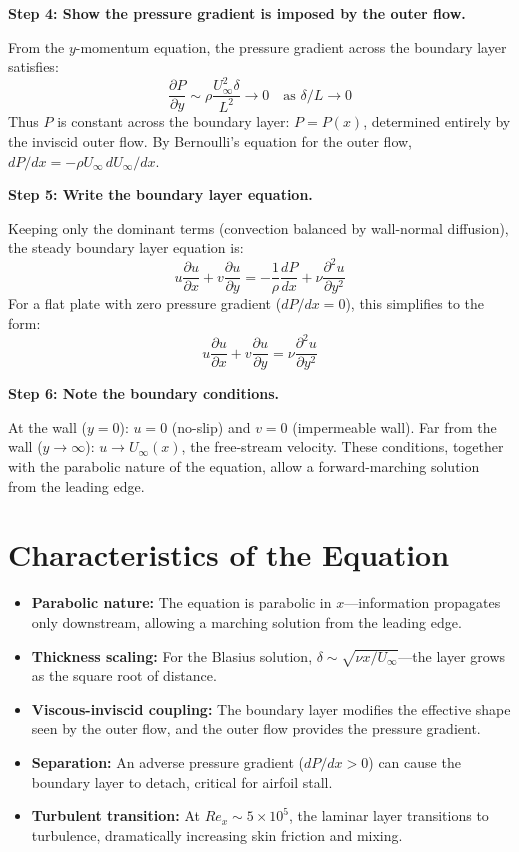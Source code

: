 \textbf{Step 4: Show the pressure gradient is imposed by the outer flow.}

From the $y$-momentum equation, the pressure gradient across the boundary layer satisfies:
\begin{equation}
\frac{\partial P}{\partial y} \sim \rho\frac{U_\infty^2 \delta}{L^2} \to 0 \quad \text{as } \delta/L \to 0
\end{equation}
Thus $P$ is constant across the boundary layer: $P = P(x)$, determined entirely by the inviscid outer flow. By Bernoulli's equation for the outer flow, $dP/dx = -\rho U_\infty\, dU_\infty/dx$.

\textbf{Step 5: Write the boundary layer equation.}

Keeping only the dominant terms (convection balanced by wall-normal diffusion), the steady boundary layer equation is:
\begin{equation}
u\frac{\partial u}{\partial x} + v\frac{\partial u}{\partial y} = -\frac{1}{\rho}\frac{dP}{dx} + \nu\frac{\partial^2 u}{\partial y^2}
\end{equation}
For a flat plate with zero pressure gradient ($dP/dx = 0$), this simplifies to the form:
\begin{equation}
\boxed{u\frac{\partial u}{\partial x} + v\frac{\partial u}{\partial y} = \nu\frac{\partial^2 u}{\partial y^2}}
\end{equation}

\textbf{Step 6: Note the boundary conditions.}

At the wall ($y = 0$): $u = 0$ (no-slip) and $v = 0$ (impermeable wall). Far from the wall ($y \to \infty$): $u \to U_\infty(x)$, the free-stream velocity. These conditions, together with the parabolic nature of the equation, allow a forward-marching solution from the leading edge.

\section*{Characteristics of the Equation}

\begin{itemize}
\item \textbf{Parabolic nature:} The equation is parabolic in $x$---information propagates only downstream, allowing a marching solution from the leading edge.
\item \textbf{Thickness scaling:} For the Blasius solution, $\delta \sim \sqrt{\nu x / U_\infty}$---the layer grows as the square root of distance.
\item \textbf{Viscous-inviscid coupling:} The boundary layer modifies the effective shape seen by the outer flow, and the outer flow provides the pressure gradient.
\item \textbf{Separation:} An adverse pressure gradient ($dP/dx > 0$) can cause the boundary layer to detach, critical for airfoil stall.
\item \textbf{Turbulent transition:} At $Re_x \sim 5 \times 10^5$, the laminar layer transitions to turbulence, dramatically increasing skin friction and mixing.
\end{itemize}
